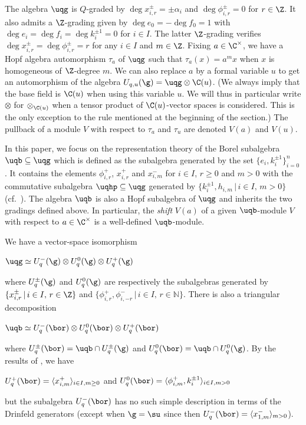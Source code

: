 \documentclass[11pt]{amsart}
\theoremstyle{definition}
\theoremstyle{remark}
\numberwithin{equation}{section}
\begin{document}
The algebra $\uqg$ is $Q$-graded by $\deg x_{i,r}^{\pm} = \pm \alpha_i$ and $\deg \phi_{i,r}^{\pm} = 0$ for $r \in \Z$. It also admits a $\Z$-grading given by $\deg e_0 = -\deg f_0 = 1$ with $\deg e_i = \deg f_i = \deg k_i^{\pm 1} = 0$ for $i\in I$. The latter $\Z$-grading verifies $\deg x_{i,r}^{\pm}= \deg \phi_{i,r}^{\pm}=r$ for any $i\in I$ and $m\in \Z$. Fixing $a \in \C^{\times}$, we have a Hopf algebra automorphism $\tau_{a}$ of $\uqg$ such that $\tau_{a}(x)=a^m x$ when $x$ is homogeneous of $\Z$-degree $m$. We can also replace $a$ by a formal variable $u$ to get an automorphism of the algebra $U_{q,u}(\g) = \uqg\otimes \C(u)$. (We always imply that the base field is $\C(u)$ when using this variable $u$. We will thus in particular write $\otimes$ for $\otimes_{\C(u)}$ when a tensor product of $\C(u)$-vector spaces is considered. This is the only exception to the rule mentioned at the beginning of the section.) The pullback of a module $V$ with respect to $\tau_{a}$ and $\tau_{u}$ are denoted $V(a)$ and $V(u)$. \par
In this paper, we focus on the representation theory of the Borel subalgebra $\uqb\subseteq \uqg$ which is defined as the subalgebra generated by the set $\{e_i,k_i^{\pm 1}\}_{i=0}^n$. It contains the elements $\phi_{i,r}^+$, $x_{i,r}^{+}$ and $x_{i,m}^{-}$ for $i\in I$, $r \geq 0$ and $m>0$ with the commutative subalgebra $\uqhp\subseteq \uqg$ generated by $\{k_i^{\pm 1},h_{i,m}\,|\, i\in I,\, m>0\}$ (cf.~\cite{hj}). The algebra $\uqb$ is also a Hopf subalgebra of $\uqg$ and inherits the two gradings defined above. In particular, the \textit{shift} $V(a)$ of a given $\uqb$-module $V$ with respect to $a \in \C^{\times}$ is a well-defined $\uqb$-module. \par 
We have a vector-space isomorphism \cite{b,bcp}
\begin{center}
$\uqg \simeq U^-_q(\g)\otimes U^0_q(\g) \otimes U^+_q(\g)$
\end{center}
where $U_q^{\pm}(\g)$ and $U_q^0(\g)$ are respectively the subalgebras generated by $\{x_{i,r}^{\pm}\,|\,i\in I,\, r \in \Z\}$ and $\{\phi_{i,r}^{+},\phi_{i,-r}^-\,|\, i\in I,\, r\in \mathbb{N}\}$. There is also a triangular decomposition \cite{b,hj}
\begin{center}
$\uqb \simeq U^-_q(\bor)\otimes U^0_q(\bor) \otimes U^+_q(\bor)$
\end{center}
where $U_q^{\pm}(\bor) = \uqb\cap U_q^{\pm}(\g)$ and $U_q^0(\bor) = \uqb\cap U_q^0(\g)$. By the results of \cite{hj}, we have
\begin{center}
$U_q^{+}(\bor)= \langle x_{i,m}^+\rangle_{i\in I,m\geq 0}$ and $U_q^0(\bor) = \langle \phi_{i,m}^+, k_i^{\pm 1}\rangle_{i\in I,m>0}$
\end{center}
but the subalgebra $U_q^-(\bor)$ has no such simple description in terms of the Drinfeld generators (except when $\g = \su$ since then $U_q^-(\bor) = \langle x_{1,m}^-\rangle_{m>0}$).
\end{document}

